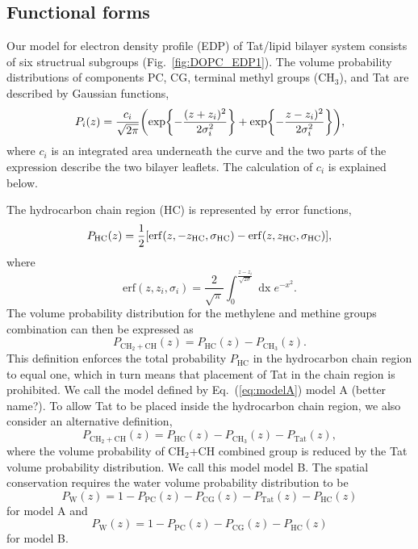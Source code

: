 \documentclass[12pt,letterpaper]{article}
\newcommand{\z}[1]{z_\textrm{#1}}
\newcommand{\sigmaHC}{\sigma_\textrm{HC}}
\newcommand{\PPC}{P_\textrm{PC}}
\newcommand{\PCG}{P_\textrm{CG}}
\newcommand{\PCHthree}{P_{\textrm{CH}_3}}
\newcommand{\PCHtwoCH}{P_{\textrm{CH}_2+\textrm{CH}}}
\newcommand{\PHC}{P_\textrm{HC}}
\newcommand{\PTat}{P_\textrm{Tat}}
\newcommand{\PW}{P_\textrm{W}}
\newcommand{\CH}[1]{\textrm{CH}_#1}
\newcommand{\dx}{\mathop{dx}}
\begin{document}
\subsection{Functional forms}
Our model for electron density profile (EDP)
of Tat/lipid bilayer system consists of six structrual subgroups 
(Fig.~\ref{fig:DOPC_EDP1}).
The volume probability distributions of components PC, CG, terminal
methyl groups ($\CH{3}$), and Tat are described by Gaussian functions,
\begin{equation}
  P_i(z)=\frac{c_i}{\sqrt{2\pi}}\mathopen{}\left( 
    \exp\mathopen{}\left\lbrace -\frac{(z+z_i)^2}{2\sigma_i^2} \right\rbrace\mathclose{}
	+ \exp\mathopen{}\left\lbrace -\frac{z-z_i)^2}{2\sigma_i^2} \right\rbrace\mathclose{}
   \right)\mathclose{},
\end{equation}
where $c_i$ is an integrated area underneath the curve and the two parts of the 
expression describe the two bilayer leaflets. The calculation of $c_i$ is 
explained below.

The hydrocarbon chain region (HC) is represented by error functions,
\begin{equation}
  \PHC(z) = \frac{1}{2}\bracks{
    \mathrm{erf}(z,-\z{HC},\sigmaHC) - \mathrm{erf}(z,\z{HC},\sigmaHC)
  },
\end{equation}
where
\begin{equation}
  \mathrm{erf}(z,z_i,\sigma_i)=\frac{2}{\sqrt{\pi}}
    \int_0^{\frac{z-z_i}{\sqrt{2\sigma}}} \dx e^{-x^2}.
\end{equation}
The volume probability distribution for the methylene and methine groups 
combination can then be expressed as
\begin{equation}
  \PCHtwoCH(z) = \PHC(z)-\PCHthree(z).
  \label{eq:modelA}
\end{equation}
This definition enforces the total probability $\PHC$ in the hydrocarbon
chain region to equal one, which in turn means that placement of Tat in the  
chain region is prohibited. We call the model defined by Eq.~(\ref{eq:modelA})
model A (better name?). To allow Tat to be placed inside the hydrocarbon
chain region, we also consider an alternative definition,
\begin{equation}
  \PCHtwoCH(z) = \PHC(z)-\PCHthree(z) - \PTat(z),
\end{equation}
where the volume probability of CH$_2$+CH combined group is reduced by 
the Tat volume probability distribution. We call this model model B.
The spatial conservation requires the water volume probability distribution 
to be
\begin{equation}
  \PW(z) = 1-\PPC(z)-\PCG(z)-\PTat(z)-\PHC(z)
\end{equation}
for model A and
\begin{equation}
  \PW(z) = 1-\PPC(z)-\PCG(z)-\PHC(z)
\end{equation}
for model B.
\end{document}

